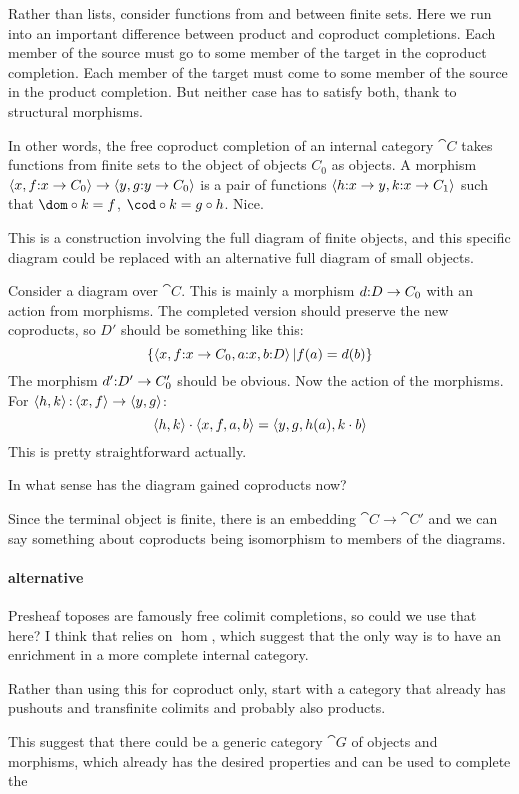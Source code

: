 \documentclass[csh.tex]{subfiles}
\begin{document}
Rather than lists, consider functions from and between finite sets. Here we run into an important difference between product and coproduct completions. Each member of the source must go to some member of the target in the coproduct completion. Each member of the target must come to some member of the source in the product completion. But neither case has to satisfy both, thank to structural morphisms.

In other words, the free coproduct completion of an internal category $\cat C$ takes functions from finite sets to the object of objects $C_0$ as objects. A morphism $\left\langle x,f\mathord : x\to C_0 \right\rangle\to\left\langle y,g\mathord : y\to C_0 \right\rangle$ is a pair of functions $\left\langle h\mathord : x\to y,k\mathord : x\to C_1 \right\rangle$ such that $\dom\circ k = f$, $\cod\circ k = g\circ h$. Nice.

This is a construction involving the full diagram of finite objects, and this specific diagram could be replaced with an alternative full diagram of small objects.

Consider a diagram over $\cat C$. This is mainly a morphism $d\mathord : D\to C_0$ with an action from morphisms. 
The completed version should preserve the new coproducts, so $D'$ should be something like this:
\[ \left\{\left\langle x,f\mathord : x\to C_0, a\mathord : x, b\mathord : D \right\rangle| f(a) = d(b) \right\}\]
The morphism $d'\mathord : D'\to C_0'$ should be obvious. Now the action of the morphisms. For $\left\langle h,k \right\rangle\mathord :\left\langle x,f \right\rangle\to\left\langle y,g \right\rangle$:
\[ \left\langle h,k \right\rangle\cdot\left\langle x,f,a,b \right\rangle = \left\langle y,g,h(a),k\cdot b \right\rangle\]
This is pretty straightforward actually.

In what sense has the diagram gained coproducts now?

Since the terminal object is finite, there is an embedding $\cat C\to \cat C'$ and we can say something about coproducts being isomorphism to members of the diagrams.

\paragraph{alternative}
Presheaf toposes are famously free colimit completions, so could we use that here? I think that relies on $\hom$, which suggest that the only way is to have an enrichment in a more complete internal category.

Rather than using this for coproduct only, start with a category that already has pushouts and transfinite colimits and probably also products.

This suggest that there could be a generic category $\cat G$ of objects and morphisms, which already has the desired properties and can be used to complete the 
\end{document}
